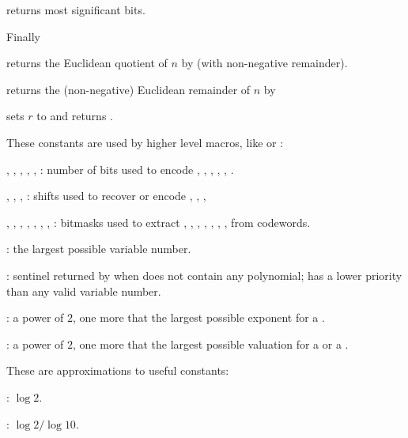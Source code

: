  returns most significant bits.

\noindent Finally

 returns the Euclidean quotient of $n$ by
 (with non-negative remainder).

 returns the (non-negative) Euclidean remainder of $n$
by 


 sets $r$ to 
and returns .


These constants are used by higher level macros, like  or :

\noindent {},
,
,
,
,
:
number of bits used to encode , , ,
, , .

\noindent {},
,
,
: shifts used to recover or encode , ,
, 

\noindent {},
,
,
,
,
,
,
: bitmasks used to extract , , ,
, , , ,  from 
codewords.

\noindent {}: the largest possible variable number.

\noindent {}:  sentinel returned by  when 
does not contain any polynomial; has a lower priority than any valid variable
number.

\noindent {}: a power of $2$, one more that the largest possible
exponent for a .

\noindent {}: a power of $2$, one more that the largest possible
valuation for a  or a .


These are  approximations to useful constants:

\noindent {}: $\log 2$.

\noindent {}: $\log 2 / \log 10$.

